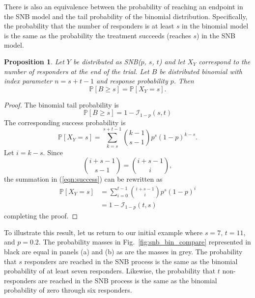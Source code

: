 \documentclass[12pt]{article}
\newtheorem{prop}{Proposition}
\begin{document}
There is also an equivalence between the probability of reaching an endpoint 
in the SNB model and the tail probability of the binomial distribution.
Specifically, the probability that the number of responders is at least 
$s$ in the binomial model is the same as the probability the treatment succeeds 
(reaches $s$) in the SNB model.
\begin{prop} \label{binomial_tail}
Let $Y$ be distributed as SNB($p$, $s$, $t$) and let $X_Y$ correspond
to the number of responders at the end of the trial. Let 
$B$ be distributed binomial with index parameter $n=s+t-1$ and response 
probability $p$. Then
\begin{equation}
\mathbb{P}[B \geq s] = \mathbb{P} [X_Y = s].
\end{equation}
\end{prop}
\begin{proof}
The binomial tail probability is
\begin{equation*}
\mathbb{P}[B \geq s] = 1 - \mathcal{I}_{1-p}(s, t)
\end{equation*}
The corresponding success probability is
\begin{equation} \label{eqn:success}
\mathbb{P} [X_Y = s] 
  = \sum_{k=s}^{s+t-1} {k-1 \choose s-1} p^s (1-p)^{k-s}.
\end{equation}
Let $i=k-s$. Since
\begin{equation*}
{i+s-1 \choose s-1} = {i+s-1 \choose i},
\end{equation*}
the summation in (\ref{eqn:success}) can be rewritten as
\begin{align*}
\mathbb{P} [X_Y = s] &= \sum_{i=0}^{t-1} {i+s-1 \choose i} p^s (1-p)^i\\
  &= 1 - \mathcal{I}_{1-p}(t, s)
\end{align*}
completing the proof.
\end{proof}

To illustrate this result, let us return to our initial example
where $s=7$, $t=11$, and $p=0.2$.  The probability masses in
Fig.~\ref{fig:snb_bin_compare} represented in 
black are equal in panels (a) and (b) as are the masses in grey.
The probability that $s$
responders are reached in the SNB process is the same as the binomial 
probability of at least seven responders. Likewise, the probability that $t$ 
non-responders are reached in the SNB process is the same as the binomial
probability of zero through six responders.
\end{document}
